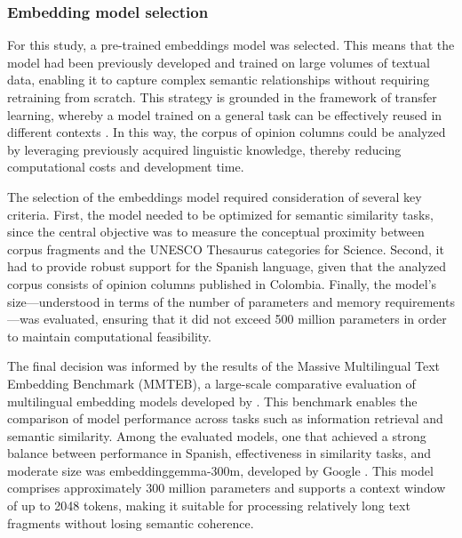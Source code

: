 \documentclass[11pt,a4paper]{article}
\begin{document}
	\subsubsection{Embedding model selection}
For this study, a pre-trained embeddings model was selected. This means that the model had been previously developed and trained on large volumes of textual data, enabling it to capture complex semantic relationships without requiring retraining from scratch. This strategy is grounded in the framework of transfer learning, whereby a model trained on a general task can be effectively reused in different contexts \cite{Hosna2022}. In this way, the corpus of opinion columns could be analyzed by leveraging previously acquired linguistic knowledge, thereby reducing computational costs and development time.

The selection of the embeddings model required consideration of several key criteria. First, the model needed to be optimized for semantic similarity tasks, since the central objective was to measure the conceptual proximity between corpus fragments and the UNESCO Thesaurus categories for Science. Second, it had to provide robust support for the Spanish language, given that the analyzed corpus consists of opinion columns published in Colombia. Finally, the model’s size—understood in terms of the number of parameters and memory requirements—was evaluated, ensuring that it did not exceed 500 million parameters in order to maintain computational feasibility.

The final decision was informed by the results of the Massive Multilingual Text Embedding Benchmark (MMTEB), a large-scale comparative evaluation of multilingual embedding models developed by \cite{enevoldsen2025mmtebmassivemultilingualtext}. This benchmark enables the comparison of model performance across tasks such as information retrieval and semantic similarity. Among the evaluated models, one that achieved a strong balance between performance in Spanish, effectiveness in similarity tasks, and moderate size was embeddinggemma-300m, developed by Google \cite{vera2025embeddinggemmapowerfullightweighttext}. This model comprises approximately 300 million parameters and supports a context window of up to 2048 tokens, making it suitable for processing relatively long text fragments without losing semantic coherence.
\end{document}
